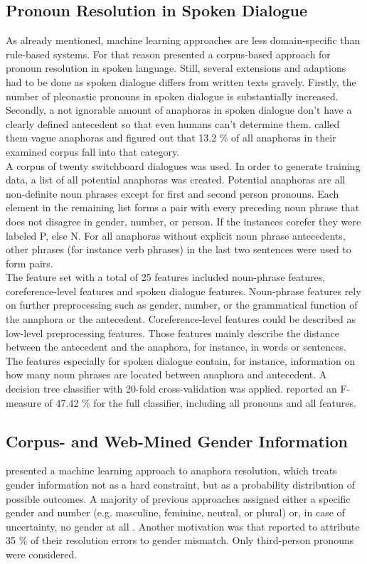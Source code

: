 \subsection{Pronoun Resolution in Spoken Dialogue}
As already mentioned, machine learning approaches are less domain-specific than rule-based systems. For that reason \citep{strube2003machine} presented a corpus-based approach for pronoun resolution in spoken language. Still, several extensions and adaptions had to be done as spoken dialogue differs from written texts gravely. Firstly, the number of pleonastic pronouns in spoken dialogue is substantially increased. Secondly, a not ignorable amount of anaphoras in spoken dialogue don't have a clearly defined antecedent so that even humans can't determine them. \citep{eckert2000dialogue} called them vague anaphoras and figured out that 13.2 \% of all anaphoras in their examined corpus fall into that category.\\
A corpus of twenty switchboard dialogues was used. In order to generate training data, a list of all potential anaphoras was created. Potential anaphoras are all non-definite noun phrases except for first and second person pronouns. Each element in the remaining list forms a pair with every preceding noun phrase that does not disagree in gender, number, or person. If the instances corefer they were labeled P, else N. For all anaphoras without explicit noun phrase antecedents, other phrases (for instance verb phrases) in the last two sentences were used to form pairs. \\
The feature set with a total of 25 features included noun-phrase features, coreference-level features and spoken dialogue features. Noun-phrase features rely on further preprocessing such as gender, number, or the grammatical function of the anaphora or the antecedent. Coreference-level features could be described as low-level preprocessing features. Those features mainly describe the distance between the antecedent and the anaphora, for instance, in words or sentences. The features especially for spoken dialogue contain, for instance, information on how many noun phrases are located between anaphora and antecedent.
A decision tree classifier with 20-fold cross-validation was applied. \citep{strube2003machine} reported an F-measure of 47.42 \% for the full classifier, including all pronouns and all features. 


\subsection{Corpus- and Web-Mined Gender Information}
\label{section:bergsma2005automatic}
\cite{bergsma2005automatic} presented a machine learning approach to anaphora resolution, which treats gender information not as a hard constraint, but as a probability distribution of possible outcomes. A majority of previous approaches assigned either a specific gender and number (e.g. masculine, feminine, neutral, or plural) or, in case of uncertainty, no gender at all \citep{soon2001machine, broscheit2010bart}. Another motivation was that \cite{kennedy1996anaphora} reported to attribute 35 \% of their resolution errors to gender mismatch. Only third-person pronouns were considered.

